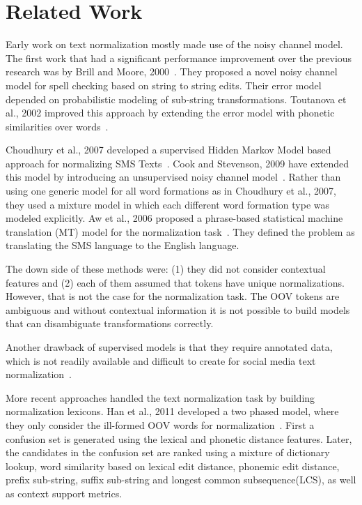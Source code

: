 \documentclass[preprint,review,12pt]{elsarticle}
\begin{document}
\section{Related Work}
\label{sec:related}

Early work on text normalization mostly made use of the noisy channel model. The first work that had a significant performance improvement over the previous research was by Brill and Moore, 2000~\cite{Brill:2000:IEM:1075218.1075255}. They proposed a novel noisy channel model for spell checking based on string to string edits. Their error model depended on probabilistic modeling of sub-string transformations. Toutanova et al., 2002 improved this approach by extending the error model with phonetic similarities over words~\cite{Toutanova:2002:PMI:1073083.1073109}.

Choudhury et al., 2007 developed a supervised Hidden Markov Model based approach for normalizing SMS Texts~\cite{Choudhury:2007:IMS:1326044.1326048}. Cook and Stevenson, 2009 have extended this model by introducing an unsupervised noisy channel model~\cite{Cook:2009:UMT:1642011.1642021}. Rather than using one generic model for all word formations as in Choudhury et al., 2007, they used a mixture model in which each different word formation type was modeled explicitly. Aw et al., 2006 proposed a phrase-based statistical machine translation (MT) model for the normalization task~\cite{Aw:2006:PSM:1273073.1273078}. They defined the problem as translating the SMS language to the English language.

The down side of these methods were: (1) they did not consider contextual features and (2) each of them assumed that tokens have unique normalizations. However, that is not the case for the normalization task. The OOV tokens are ambiguous and without contextual information it is not possible to build models that can disambiguate transformations correctly.

Another drawback of supervised models is that they require annotated data, which is not readily available and difficult to create for social media text normalization~\cite{DBLP:conf/emnlp/YangE13}.

More recent approaches handled the text normalization task by building normalization lexicons. Han et al., 2011 developed a two phased model, where they only consider the ill-formed OOV words for normalization~\cite{Han:2011:LNS:2002472.2002520}. First a confusion set is generated using the lexical and phonetic distance features. Later, the candidates in the confusion set are ranked using a mixture of dictionary lookup, word similarity based on lexical edit distance, phonemic edit distance, prefix sub-string, suffix sub-string and longest common subsequence(LCS), as well as context support metrics.
\end{document}
